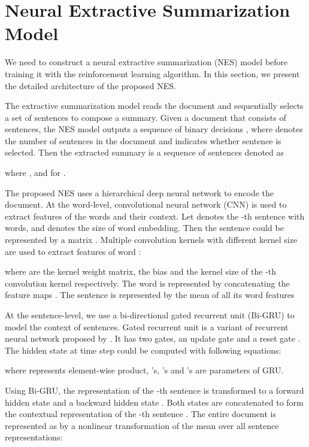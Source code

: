 \documentclass[letterpaper]{article} \usepackage{aaai18}  \usepackage{times}  \usepackage{helvet}  \usepackage{courier}  \usepackage{url}  \usepackage{graphicx}  \usepackage{amssymb}
\begin{document}
	\section{Neural Extractive Summarization Model}
	
	We need to construct a neural extractive summarization (NES) model before training it with the reinforcement learning algorithm. In this section, we present the detailed architecture of the proposed NES.  
	


	The extractive summarization model reads the document and sequentially selects a set of sentences to compose a summary. Given a document  that consists of  sentences, the NES model outputs a sequence of binary decisions , where  denotes the number of sentences in the document and  indicates whether sentence  is selected. Then the extracted summary is a sequence of  sentences denoted as
	
	where , and  for .
	
	The proposed NES uses a hierarchical deep neural network to encode the document. At the word-level, convolutional neural network (CNN) is used to extract features of the words and their context. Let  denotes the -th sentence with  words, and  denotes the size of word embedding. Then the sentence could be represented by a matrix . Multiple convolution kernels with different kernel size are used to extract features of word :
	
	where  are the kernel weight matrix, the bias and the kernel size of the -th convolution kernel respectively. The word  is represented by concatenating the feature maps . The sentence  is represented by the mean of all its word features
	
	
	At the sentence-level, we use a bi-directional gated recurrent unit (Bi-GRU) to model the context of sentences. Gated recurrent unit is a variant of recurrent neural network proposed by \cite{chung2014empirical}. It has two gates, an update gate  and a reset gate . The hidden state  at time step  could be computed with following equations:
	
	
	
	
	where  represents element-wise product, 's, 's and 's are parameters of GRU. 
	
	Using Bi-GRU, the representation of the -th sentence  is transformed to a forward hidden state  and a backward hidden state . Both states are concatenated to form the contextual representation of the -th sentence . The entire document is represented as  by a nonlinear transformation of the mean over all sentence representations:
	
\end{document}
